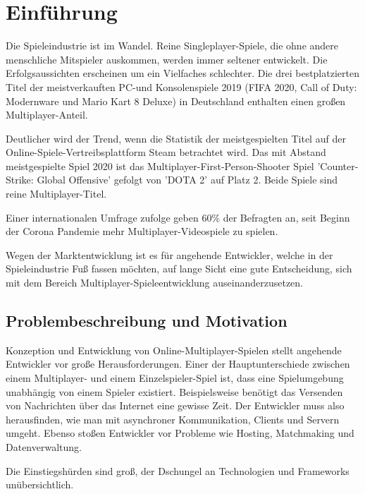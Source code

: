 \chapter{Einführung}
\label{sec:einfuehrung}

Die Spieleindustrie ist im Wandel. Reine Singleplayer-Spiele, die ohne andere menschliche Mitspieler auskommen, werden immer seltener entwickelt. Die Erfolgsaussichten erscheinen um ein Vielfaches schlechter. Die drei bestplatzierten Titel der meistverkauften PC-und Konsolenspiele 2019 (FIFA 2020, Call of Duty: Modernware und Mario Kart 8 Deluxe) in Deutschland enthalten einen großen Multiplayer-Anteil.\cite{gameVerbandderdeutschenGamesBranchee.V..2020}

Deutlicher wird der Trend, wenn die Statistik der meistgespielten Titel auf der Online-Spiele-Vertreibsplattform Steam betrachtet wird. Das mit Abstand meistgespielte Spiel 2020 ist das Multiplayer-First-Person-Shooter Spiel 'Counter-Strike: Global Offensive' gefolgt von 'DOTA 2' auf Platz 2. Beide Spiele sind reine Multiplayer-Titel.\cite{GitHyp.February2021}

Einer internationalen Umfrage zufolge geben 60\% der Befragten an, seit Beginn der Corona Pandemie mehr Multiplayer-Videospiele zu spielen. \cite{SimonKucher&Partners.2020}

Wegen der Marktentwicklung ist es für angehende Entwickler, welche in der Spieleindustrie Fuß fassen möchten, auf lange Sicht eine gute Entscheidung, sich mit dem Bereich Multiplayer-Spieleentwicklung auseinanderzusetzen.

\section{Problembeschreibung und Motivation}

Konzeption und Entwicklung von Online-Multiplayer-Spielen stellt angehende Entwickler vor große Herausforderungen. Einer der Hauptunterschiede zwischen einem Multiplayer- und einem Einzelspieler-Spiel ist, dass eine Spielumgebung unabhängig von einem Spieler existiert. Beispielsweise benötigt das Versenden von Nachrichten über das Internet eine gewisse Zeit. Der Entwickler muss also herausfinden, wie man mit asynchroner Kommunikation, Clients und Servern umgeht. Ebenso stoßen Entwickler vor Probleme wie Hosting, Matchmaking und Datenverwaltung.
\cite{Payne.18.09.2019}

Die Einstiegshürden sind groß, der Dschungel an Technologien und Frameworks unübersichtlich. \cite{MFatihMAR.2021}

